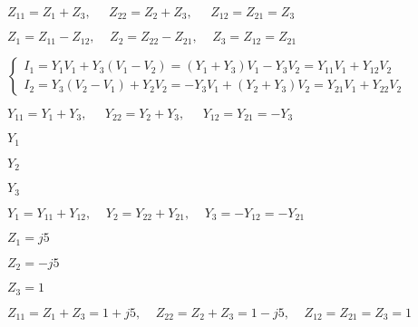 \documentclass{article}
\def\lthtmlcheckvsize{\ifdim\ht\sizebox<\vsize 
  \ifdim\wd\sizebox<\hsize\expandafter\hfill\fi \expandafter\vfill
  \else\expandafter\vss\fi}%
\begin{document}
{\newpage\clearpage
{}%
$\displaystyle Z_{11}=Z_1+Z_3,\;\;\;\;\;Z_{22}=Z_2+Z_3,\;\;\;\;\;Z_{12}=Z_{21}=Z_3$%
\lthtmlindisplaymathZ
\lthtmlcheckvsize\clearpage}

{\newpage\clearpage
{}%
$\displaystyle Z_1=Z_{11}-Z_{12},\;\;\;\;Z_2=Z_{22}-Z_{21},\;\;\;\;Z_3=Z_{12}=Z_{21}$%
\lthtmlindisplaymathZ
\lthtmlcheckvsize\clearpage}

{\newpage\clearpage
{}%
$\displaystyle \left\{ \begin{array}{l}
I_1=Y_1V_1+Y_3(V_1-V_2)=(Y_1+Y_3)V_1-Y_3V_2=Y_{11}V_1+Y_{12}V_2 \\
I_2=Y_3(V_2-V_1)+Y_2V_2=-Y_3V_1+(Y_2+Y_3)V_2=Y_{21}V_1+Y_{22}V_2
\end{array} \right.$%
\lthtmlindisplaymathZ
\lthtmlcheckvsize\clearpage}

{\newpage\clearpage
{}%
$\displaystyle Y_{11}=Y_1+Y_3,\;\;\;\;\;Y_{22}=Y_2+Y_3,\;\;\;\;\;Y_{12}=Y_{21}=-Y_3$%
\lthtmlindisplaymathZ
\lthtmlcheckvsize\clearpage}

{\newpage\clearpage
{}%
$ Y_1$%
\lthtmlindisplaymathZ
\lthtmlcheckvsize\clearpage}

{\newpage\clearpage
{}%
$ Y_2$%
\lthtmlindisplaymathZ
\lthtmlcheckvsize\clearpage}

{\newpage\clearpage
{}%
$ Y_3$%
\lthtmlindisplaymathZ
\lthtmlcheckvsize\clearpage}

{\newpage\clearpage
{}%
$\displaystyle Y_1=Y_{11}+Y_{12},\;\;\;\;Y_2=Y_{22}+Y_{21},\;\;\;\;Y_3=-Y_{12}=-Y_{21}$%
\lthtmlindisplaymathZ
\lthtmlcheckvsize\clearpage}

{\newpage\clearpage
{}%
$ Z_1=j5$%
\lthtmlindisplaymathZ
\lthtmlcheckvsize\clearpage}

{\newpage\clearpage
{}%
$ Z_2=-j5$%
\lthtmlindisplaymathZ
\lthtmlcheckvsize\clearpage}

{\newpage\clearpage
{}%
$ Z_3=1$%
\lthtmlindisplaymathZ
\lthtmlcheckvsize\clearpage}

{\newpage\clearpage
{}%
$\displaystyle Z_{11}=Z_1+Z_3=1+j5,\;\;\;\;Z_{22}=Z_2+Z_3=1-j5,\;\;\;\;Z_{12}=Z_{21}=Z_3=1$%
\lthtmlindisplaymathZ
\lthtmlcheckvsize\clearpage}
\end{document}
